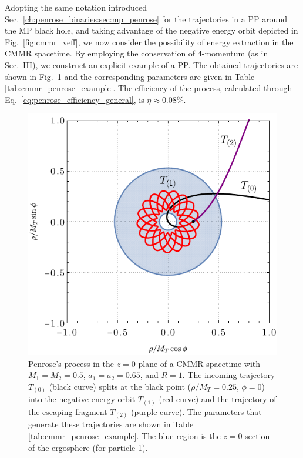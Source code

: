 Adopting the same notation introduced Sec.~\ref{ch:penrose_binaries:sec:mp_penrose} for the trajectories in a PP around the MP black hole, and taking advantage of the negative energy orbit depicted in Fig.~\ref{fig:cmmr_veff}, we now consider the possibility of energy extraction in the CMMR spacetime. By employing the conservation of 4-momentum (as in Sec.~III), we construct an explicit example of a PP. The obtained trajectories are shown in Fig.~\ref{fig:cmmr_penrose} and the corresponding parameters are given in Table \ref{tab:cmmr_penrose_example}. The efficiency of the process, calculated through Eq.~\eqref{eq:penrose_efficiency_general}, is $\eta \approx 0.08 \%$.

\begin{figure}[!ht]
  \centering
  \includegraphics[width=\linewidth]{img/penrose_binaries/fig14.pdf}
  \caption{Penrose's process in the $z=0$ plane of a CMMR spacetime with $M_1=M_2=0.5$, $a_1=a_2=0.65$, and $R=1$. The incoming trajectory $T_{(0)}$ (black curve) splits at the black point ($\rho/M_T=0.25$, $\phi=0$) into the negative energy orbit $T_{(1)}$ (red curve) and the trajectory of the escaping fragment $T_{(2)}$ (purple curve). The parameters that generate these trajectories are shown in Table \ref{tab:cmmr_penrose_example}. The blue region is the $z=0$ section of the ergosphere (for particle 1).}
  \label{fig:cmmr_penrose}
\end{figure}

